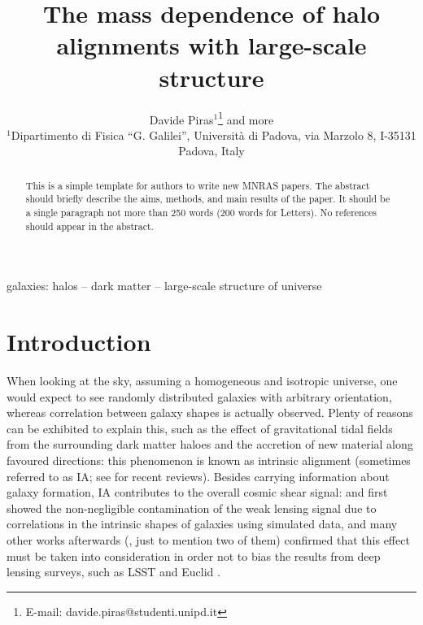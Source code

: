 \documentclass[a4paper,fleqn,usenatbib]{mnras}
\title[Mass dependence of halo alignments]{The mass dependence of halo alignments with large-scale structure}
\author[D. Piras and more]{
Davide Piras$^{1}$\thanks{E-mail: davide.piras@studenti.unipd.it}
and more
\\
$^{1}$Dipartimento di Fisica ``G. Galilei'', Universit\`{a} di Padova, via Marzolo 8, I-35131 Padova, Italy\\
}
\begin{document}
\label{firstpage}
\pagerange{\pageref{firstpage}--\pageref{lastpage}}
\maketitle

\begin{abstract}
This is a simple template for authors to write new MNRAS papers.
The abstract should briefly describe the aims, methods, and main results of the paper.
It should be a single paragraph not more than 250 words (200 words for Letters).
No references should appear in the abstract.
\end{abstract}

\begin{keywords}
galaxies: halos --  dark matter -- large-scale structure of universe 
\end{keywords}



\section{Introduction}
\label{sec:intro}
When looking at the sky, assuming a homogeneous and isotropic universe, one would expect to see randomly distributed galaxies with arbitrary orientation, whereas correlation between galaxy shapes is actually observed. Plenty of reasons can be exhibited to explain this, such as the effect of gravitational tidal fields from the surrounding dark matter haloes and the accretion of new material along favoured directions: this phenomenon is known as intrinsic alignment (sometimes referred to as IA; see \citet{TroxelIshak2015, Joachimietal2015, Kiesslingetal2015} for recent reviews). Besides carrying information about galaxy formation, IA contributes to the overall cosmic shear signal: \citet{Heavensetal2000} and \citet{CroftMetzler2000} first showed the non-negligible contamination of the weak lensing signal due to correlations in the intrinsic shapes of galaxies using simulated data, and many other works afterwards (\citet{Heymansetal2006, Sembolonietal2008}, just to mention two of them) confirmed that this effect must be taken into consideration in order not to bias the results from deep lensing surveys, such as LSST \citep{LSST2009} and Euclid \citep{Euclid2011}.
\end{document}
